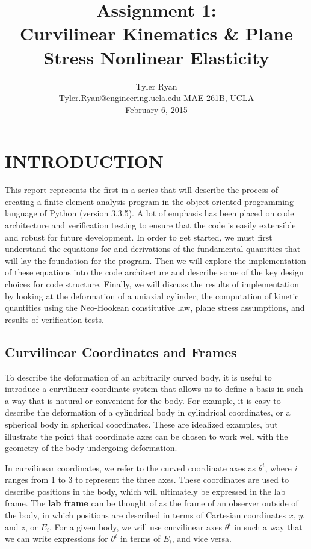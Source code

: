 \documentclass[]{spie}  %
\title{Assignment 1: \\
	Curvilinear Kinematics \& Plane Stress Nonlinear Elasticity}
\author{Tyler Ryan \\
	Tyler.Ryan@engineering.ucla.edu
\skiplinehalf
MAE 261B, UCLA \\
February 6, 2015
}
\begin{document}
 
\maketitle 


\section{INTRODUCTION}
\label{section: introduction}  %

This report represents the first in a series that will describe the process of creating a finite element analysis program in the object-oriented programming language of Python (version 3.3.5). A lot of emphasis has been placed on code architecture and verification testing to ensure that the code is easily extensible and robust for future development. In order to get started, we must first understand the equations for and derivations of the fundamental quantities that will lay the foundation for the program. Then we will explore the implementation of these equations into the code architecture and describe some of the key design choices for code structure. Finally, we will discuss the results of implementation by looking at the deformation of a uniaxial cylinder, the computation of kinetic quantities using the Neo-Hookean constitutive law, plane stress assumptions, and results of verification tests.

\subsection{Curvilinear Coordinates and Frames}

To describe the deformation of an arbitrarily curved body, it is useful to introduce a curvilinear coordinate system that allows us to define a basis in such a way that is natural or convenient for the body. For example, it is easy to describe the deformation of a cylindrical body in cylindrical coordinates, or a spherical body in spherical coordinates. These are idealized examples, but illustrate the point that coordinate axes can be chosen to work well with the geometry of the body undergoing deformation. 

In curvilinear coordinates, we refer to the curved coordinate axes as $\theta^i$, where $i$ ranges from 1 to 3 to represent the three axes. These coordinates are used to describe positions in the body, which will ultimately be expressed in the lab frame. The \textbf{lab frame} can be thought of as the frame of an observer outside of the body, in which positions are described in terms of Cartesian coordinates $x$, $y$, and $z$, or $E_i$. For a given body, we will use curvilinear axes $\theta^i$ in such a way that we can write expressions for $\theta^i$ in terms of $E_i$, and vice versa. 
\end{document}
